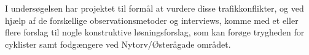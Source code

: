 I undersøgelsen har projektet til formål at vurdere disse trafikkonflikter, og ved hjælp af de forskellige observationsmetoder og interviews, komme med et eller flere forslag til nogle konstruktive løsningsforslag, som kan forøge trygheden for cyklister samt fodgængere ved Nytorv/Østerågade området.
